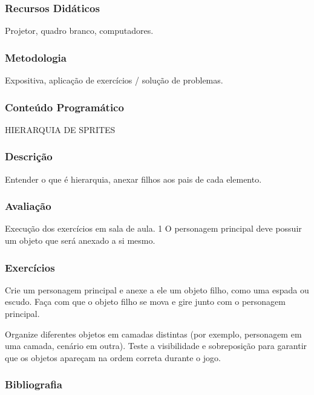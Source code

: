\documentclass[letterpaper,10pt,brazil]{sphinxmanual}
\begin{document}
\subsubsection*{Recursos Didáticos}

\sphinxAtStartPar
Projetor, quadro branco, computadores.
\subsubsection*{Metodologia}

\sphinxAtStartPar
Expositiva, aplicação de exercícios / solução de problemas.
\subsubsection*{Conteúdo Programático}

\sphinxAtStartPar
HIERARQUIA DE SPRITES
\subsubsection*{Descrição}

\sphinxAtStartPar
Entender o que é hierarquia, anexar filhos aos pais de cada elemento.
\subsubsection*{Avaliação}

\sphinxAtStartPar
Execução dos exercícios em sala de aula.
1 \sphinxhyphen{} O personagem principal deve possuir um objeto que será anexado a si mesmo.
\subsubsection*{Exercícios}

\sphinxAtStartPar
{}
Crie um personagem principal e anexe a ele um objeto filho, como uma espada ou escudo.
Faça com que o objeto filho se mova e gire junto com o personagem principal.

\sphinxAtStartPar
{}
Organize diferentes objetos em camadas distintas (por exemplo, personagem em uma camada, cenário em outra).
Teste a visibilidade e sobreposição para garantir que os objetos apareçam na ordem correta durante o jogo.
\subsubsection*{Bibliografia}
\end{document}
